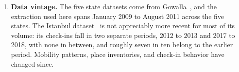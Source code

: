 \begin{enumerate}
    \item \textbf{Data vintage.} The five state datasets come from
    Gowalla~\cite{cho2011gowalla}, and the extraction used here spans January 2009
    to August 2011 across the five states. The Istanbul
    dataset~\cite{wongso2025massivesteps} is not appreciably more recent for most of its
    volume: its check-ins fall in two separate periods, 2012 to 2013 and 2017 to 2018,
    with none in between, and roughly seven in ten belong to the earlier period.
    Mobility patterns, place inventories,
    and check-in behavior have changed since.

\end{enumerate}
